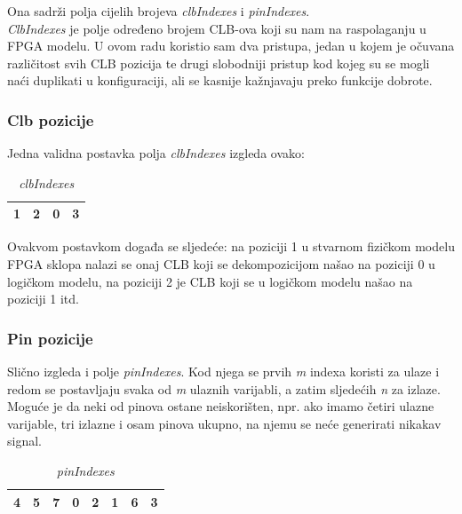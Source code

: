 \documentclass[times, utf8, zavrsni]{fer}
\begin{document}
Ona sadrži polja cijelih brojeva \emph{clbIndexes} i \emph{pinIndexes}. \\ \emph{ClbIndexes} je polje određeno brojem CLB-ova koji su nam na raspolaganju u FPGA modelu. U ovom radu koristio sam dva pristupa, jedan u kojem je očuvana različitost svih CLB pozicija te drugi slobodniji pristup kod kojeg su se mogli naći duplikati u konfiguraciji, ali se kasnije kažnjavaju preko funkcije dobrote. 

\subsubsection{Clb pozicije}

Jedna validna postavka polja \emph{clbIndexes} izgleda ovako: 

\begin{table}[htb]
	\caption{\emph{clbIndexes}}
	\label{clbIndexes}
	\centering
	\begin{tabular}{|c | c | c | r|} \hline
	1 & 2 & 0 & 3 \\ \hline
	\end{tabular}
\end{table}

Ovakvom postavkom događa se sljedeće: na poziciji 1 u stvarnom fizičkom modelu FPGA sklopa nalazi se onaj CLB koji se dekompozicijom našao na poziciji 0 u logičkom modelu, na poziciji 2 je CLB koji se u logičkom modelu našao na poziciji 1 itd. \\

\subsubsection{Pin pozicije}

Slično izgleda i polje \emph{pinIndexes}. Kod njega se prvih \emph{m} indexa koristi za ulaze i redom se postavljaju svaka od \emph{m} ulaznih varijabli, a zatim sljedećih \emph{n} za izlaze. Moguće je da neki od pinova ostane neiskorišten, npr. ako imamo četiri ulazne varijable, tri izlazne i osam pinova ukupno, na njemu se neće generirati nikakav signal. 


\begin{table}[htb]
	\caption{\emph{pinIndexes}}
	\label{pinIndexes}
	\centering
	\begin{tabular}{|c | c | c | c| c | c | c | c |} \hline
		4 & 5 & 7 & 0 & 2 & 1 & 6 & 3 \\ \hline
	\end{tabular}
\end{table}
\end{document}
